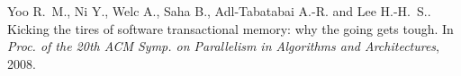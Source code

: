 \begin{thebibliography}{99}
{
Yoo R.~M., Ni Y., Welc A., Saha B., Adl-Tabatabai A.-R. and
  Lee H.-H.~S..
\newblock Kicking the tires of software transactional memory: why the going
  gets tough.
\newblock In {\em Proc. of the 20th ACM Symp. on Parallelism in Algorithms and
  Architectures}, 2008.








































































































}
\end{thebibliography}
